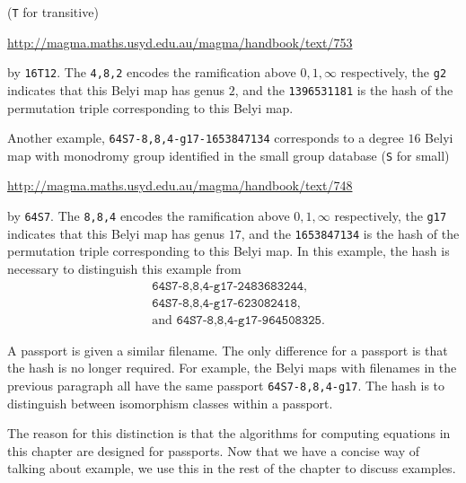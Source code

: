 \documentclass{dcthesis}
\numberwithin{equation}{section}
\theoremstyle{definition}
\theoremstyle{remark}
\begin{document}
{{{    (\texttt{T} for transitive)
    \begin{center}
      \url{http://magma.maths.usyd.edu.au/magma/handbook/text/753}
    \end{center}
    by \texttt{16T12}.
    The \texttt{4,8,2} encodes the ramification
    above $0,1,\infty$ respectively,
    the \texttt{g2} indicates that this
    Belyi map has genus $2$,
    and the \texttt{1396531181}
    is the hash of the permutation triple
    corresponding to this Belyi map.
    \par
    Another example,
    \texttt{64S7-8,8,4-g17-1653847134}
    corresponds to a degree $16$
    Belyi map with monodromy group
    identified in the
    small group database
    (\texttt{S} for small)
    \begin{center}
      \url{http://magma.maths.usyd.edu.au/magma/handbook/text/748}
    \end{center}
    by \texttt{64S7}.
    The \texttt{8,8,4} encodes the ramification
    above $0,1,\infty$ respectively,
    the \texttt{g17} indicates that this
    Belyi map has genus $17$,
    and the \texttt{1653847134}
    is the hash of the permutation triple
    corresponding to this Belyi map.
    In this example,
    the hash is necessary to distinguish
    this example from
    \begin{align*}
      &\texttt{64S7-8,8,4-g17-2483683244},\\
      &\texttt{64S7-8,8,4-g17-623082418},\\
      &\text{and }\texttt{64S7-8,8,4-g17-964508325}.
    \end{align*}
    \par
    A passport is given a similar filename.
    The only difference for a passport is that
    the hash is no longer required.
    For example,
    the Belyi maps with filenames
    in the previous paragraph
    all have the same passport
    \texttt{64S7-8,8,4-g17}.
    The hash is to distinguish between
    isomorphism classes within a passport.
    \par
    The reason for this
    distinction is that the algorithms
    for computing equations in this chapter
    are designed for passports.
    Now that we have a concise way of
    talking about example,
    we use this in the rest of the chapter
    to discuss examples.
  }
}}
\end{document}
